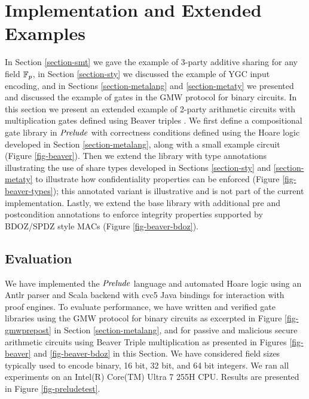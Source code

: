 \section{Implementation and Extended Examples}
\label{section-examples}

In Section \ref{section-smt} we gave the example of 3-party additive sharing
for any field $\mathbb{F}_{p}$, in Section \ref{section-sty} we discussed the
example of YGC input encoding, and in Sections \ref{section-metalang} and
\ref{section-metaty} we presented and discussed the example of gates in the GMW
protocol for binary circuits. In this section we present an extended example of
2-party arithmetic circuits with multiplication gates defined using Beaver
triples \cite{evans2018pragmatic}. We first define a compositional gate library
in $\mathit{Prelude}$ with correctness conditions defined using the Hoare logic
developed in Section \ref{section-metalang}, along with a small example circuit
(Figure \ref{fig-beaver}). Then we extend the library with type annotations
illustrating the use of share types developed in Sections \ref{section-sty} and
\ref{section-metaty} to illustrate how confidentiality properties can be
enforced (Figure \ref{fig-beaver-types}); this annotated variant is
illustrative and is not part of the current implementation. Lastly, we extend
the base library with additional pre and postcondition annotations to enforce
integrity properties supported by BDOZ/SPDZ style MACs
\cite{SPDZ1,SPDZ2,BDOZ,10.1007/978-3-030-68869-1_3} (Figure
\ref{fig-beaver-bdoz}).

\subsection{Evaluation}

We have implemented the $\mathit{Prelude}$ language and automated Hoare logic
using an Antlr parser and Scala backend with cvc5 Java bindings for
interaction with proof engines.  To evaluate performance, we have
written and verified gate libraries using the GMW protocol for binary
circuits as excerpted in Figure \ref{fig-gmwprepost} in Section
\ref{section-metalang}, and for passive and malicious secure
arithmetic circuits using Beaver Triple multiplication as presented in
Figures \ref{fig-beaver} and \ref{fig-beaver-bdoz} in this Section.
We have considered field sizes typically used to encode binary, 16
bit, 32 bit, and 64 bit integers. We ran all experiments on an Intel(R)
Core(TM) Ultra 7 255H CPU. Results are presented in Figure \ref{fig-preludetest}.


